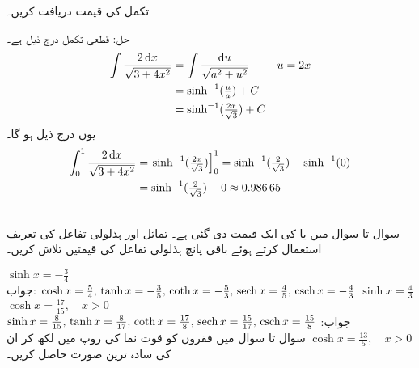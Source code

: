 تکمل  کی قیمت دریافت کریں۔

حل:\quad
قطعی تکمل درج ذیل ہے۔
\begin{align*}
\int\frac{2\dif x}{\sqrt{3+4x^2}}&=\int\frac{\dif u}{\sqrt{a^2+u^2}}&&u=2x\\
&=\sinh^{-1}(\tfrac{u}{a})+C\\
&=\sinh^{-1}(\tfrac{2x}{\sqrt{3}})+C
\end{align*}
یوں درج ذیل ہو گا۔
\begin{align*}
\int_0^1\frac{2\dif x}{\sqrt{3+4x^2}}&=\left.\sinh^{-1}(\tfrac{2x}{\sqrt{3}})\right]_0^1=\sinh^{-1}(\tfrac{2}{\sqrt{3}})-\sinh^{-1}(0)\\
&=\sinh^{-1}(\tfrac{2}{\sqrt{3}})-0\approx \num{0.98665}
\end{align*} 

\\
سوال  تا سوال  میں  یا  کی ایک قیمت دی گئی ہے۔ تماثل  اور ہذلولی تفاعل کی تعریف استعمال کرتے ہوئے باقی پانچ ہذلولی تفاعل کی قیمتیں تلاش کریں۔

$\sinh x=-\tfrac{3}{4}$\\
جواب:\quad
$\cosh x=\tfrac{5}{4},\,\tanh x=-\tfrac{3}{5},\,\coth x=-\tfrac{5}{3},\,\operatorname{sech} x=\tfrac{4}{5},\,\operatorname{csch} x=-\tfrac{4}{3}$
$\sinh x=\tfrac{4}{3}$
$\cosh x=\tfrac{17}{15},\quad x>0$\\
جواب:\quad
$\sinh x=\tfrac{8}{15},\,\tanh x=\tfrac{8}{17},\,\coth x=\tfrac{17}{8},\,\operatorname{sech} x=\tfrac{15}{17},\,\operatorname{csch} x=\tfrac{15}{8}$
$\cosh x=\tfrac{13}{5},\quad x>0$
سوال  تا سوال  میں فقروں کو قوت نما کی روپ میں لکھ کر ان کی سادہ ترین صورت حاصل کریں۔

